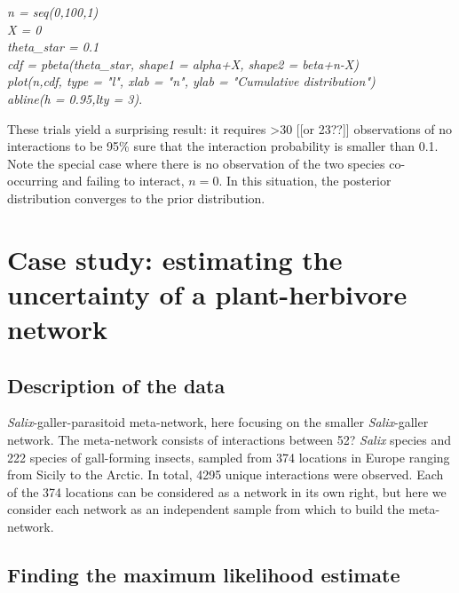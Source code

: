 \documentclass[12pt]{article}
\begin{document}
  \vspace{12pt}
\noindent\emph{
    \noindent n = seq(0,100,1)
    \\\noindent X = 0
    \\\noindent theta\_star = 0.1
    \\\noindent cdf = pbeta(theta\_star, shape1 = alpha+X, shape2 = beta+n-X)
    \\\noindent plot(n,cdf, type = "l", xlab = "n", ylab = "Cumulative distribution")
    \\\noindent abline(h = 0.95,lty = 3)}.
  \vspace{12pt}


These trials yield a surprising result: it requires \textgreater30 [[or 23??]] observations of no interactions to be 95\% sure that the interaction probability is smaller than 0.1. Note the special case where there is no observation of the two species co-occurring and failing to interact, $n = 0$. In this situation, the posterior distribution converges to the prior distribution. 


\section*{Case study: estimating the uncertainty of a plant-herbivore network}

    \subsection*{Description of the data}

      \emph{Salix}-galler-parasitoid meta-network, here focusing on the smaller \emph{Salix}-galler network. The meta-network consists of interactions between 52? \emph{Salix} species and 222 species of gall-forming insects, sampled from 374 locations in Europe ranging from Sicily to the Arctic. In total, 4295 unique interactions were observed. Each of the 374 locations can be considered as a network in its own right, but here we consider each network as an independent sample from which to build the meta-network.


  \subsection*{Finding the maximum likelihood estimate}
\end{document}
